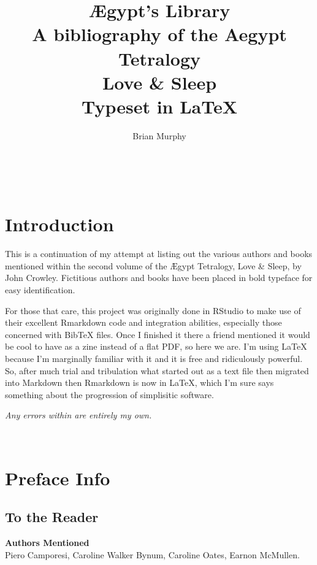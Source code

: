 \documentclass[twoside,10pt]{report}
\author{Brian Murphy}
\title{
 {\Huge Ægypt's Library} \\
 {\footnotesize A bibliography of the Aegypt Tetralogy \\
 \bigskip
 {\Large Love \& Sleep} \\
 \bigskip
 Typeset in \LaTeX{} \\
 }
}
\date{\begin{small}\today{}\end{small}}
\newcommand\fleuron{\begin{turn}{45}\Large \ding{166}\end{turn}}
\newcommand\doublefleuron{%
	\reflectbox{\fleuron}\AC\staveXLIX\reflectbox{\AC}\fleuron}
\newcommand\fleuronbar{%
	{\huge\LinearACCCXIII}\xrfill[1.3ex]{1pt}\doublefleuron\xrfill[1.3ex]{1pt}\reflectbox{\huge\LinearACCCXIII}}
\newcommand\blankpage{%
    \null
    \thispagestyle{empty}%
    \addtocounter{page}{-1}%
    \newpage%
    \pagestyle{fancy}}
\newcommand\nbvspace[1][3]{\vspace*{\stretch{#1}}}
\begin{document}


\afterpage{\blankpage}


\setcounter{tocdepth}{2}
\tableofcontents
\begin{center}
\vfill
\shadowoffset{1pt}
\shadowtext{%
{\color{Mahogany}\fontsize{60}{64}\staveL}}\\
\nbvspace[1]
\end{center}

\pagestyle{fancy}

\pagestyle{fancy}
\chapter{Introduction}
This is a continuation of my attempt at listing out the various authors and books mentioned within the second volume of the Ægypt Tetralogy, Love \& Sleep, by John Crowley. Fictitious authors and books have been placed in bold typeface for easy identification. 

For those that care, this project was originally done in RStudio to make use of their excellent Rmarkdown code and integration abilities, especially those concerned with BibTeX files. Once I finished it there a friend mentioned it would be cool to have as a zine instead of a flat PDF, so here we are. I'm using \LaTeX{} because I'm marginally familiar with it and it is free and ridiculously powerful. So, after much trial and tribulation what started out as a text file then migrated into Markdown then Rmarkdown is now in \LaTeX{}, which I'm sure says something about the progression of simplisitic software.

\textit{Any errors within are entirely my own.}

\begin{center}
\vfill
\shadowoffset{1pt}
\shadowtext{%
{\color{Mahogany}\fontsize{60}{64}\staveLIX}}\\
\nbvspace[1]
\end{center}

\chapter{Preface Info}
\section{To the Reader}
\textbf{Authors Mentioned}\\
Piero Camporesi, Caroline Walker Bynum, Caroline Oates, Earnon McMullen.
\\
\end{document}
